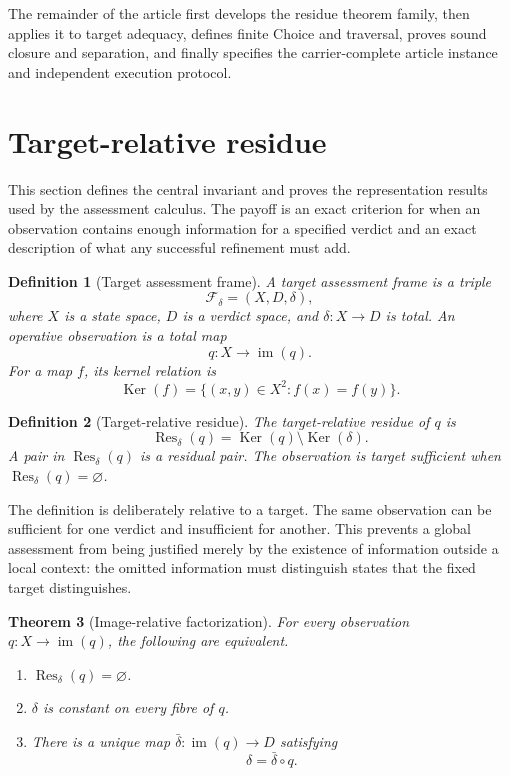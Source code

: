 \documentclass[10pt]{article}
\newtheorem{definition}{Definition}[section]
\newtheorem{theorem}[definition]{Theorem}
\newcommand{\Res}{\operatorname{Res}}
\newcommand{\Ker}{\operatorname{Ker}}
\begin{document}
The remainder of the article first develops the residue theorem family, then applies it to target adequacy, defines finite Choice and traversal, proves sound closure and separation, and finally specifies the carrier-complete article instance and independent execution protocol.

\section{Target-relative residue}

This section defines the central invariant and proves the representation results used by the assessment calculus.  The payoff is an exact criterion for when an observation contains enough information for a specified verdict and an exact description of what any successful refinement must add.

\begin{definition}[Target assessment frame]
A target assessment frame is a triple
\[
  \mathcal F_\delta=(X,D,\delta),
\]
where $X$ is a state space, $D$ is a verdict space, and $\delta:X\to D$ is total.  An operative observation is a total map
\[
  q:X\to\operatorname{im}(q).
\]
For a map $f$, its kernel relation is
\[
  \Ker(f)=\{(x,y)\in X^2:f(x)=f(y)\}.
\]
\end{definition}

\begin{definition}[Target-relative residue]
The target-relative residue of $q$ is
\[
  \Res_\delta(q)=\Ker(q)\setminus\Ker(\delta).
\]
A pair in $\Res_\delta(q)$ is a residual pair.  The observation is \emph{target sufficient} when $\Res_\delta(q)=\varnothing$.
\end{definition}

The definition is deliberately relative to a target.  The same observation can be sufficient for one verdict and insufficient for another.  This prevents a global assessment from being justified merely by the existence of information outside a local context: the omitted information must distinguish states that the fixed target distinguishes.

\begin{theorem}[Image-relative factorization]\label{thm:factorization}
For every observation $q:X\to\operatorname{im}(q)$, the following are equivalent.
\begin{enumerate}
  \item $\Res_\delta(q)=\varnothing$.
  \item $\delta$ is constant on every fibre of $q$.
  \item There is a unique map $\bar\delta:\operatorname{im}(q)\to D$ satisfying
  \[
    \delta=\bar\delta\circ q.
  \]
\end{enumerate}
\end{theorem}
\end{document}
